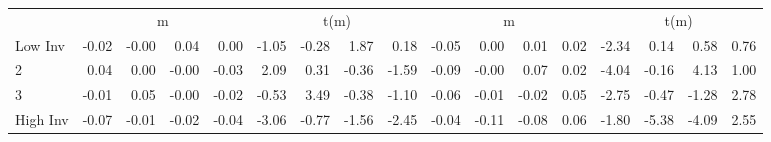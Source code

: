 \begin{table}[!ht]
\begin{tabular}{lrrrrrrrrrrrrrrrr}
  
    
      & \multicolumn{4}{c}{m} & \multicolumn{4}{c}{t(m)}
    
      & \multicolumn{4}{c}{m} & \multicolumn{4}{c}{t(m)}
    
    \\
      \cmidrule(r){2-5} \cmidrule(r){6-9} \cmidrule(r){10-13} \cmidrule(r){14-17}

    Low Inv   & -0.02  & -0.00  & 0.04  & 0.00  & -1.05  & -0.28  & 1.87  & 0.18  & -0.05  & 0.00  & 0.01  & 0.02  & -2.34  & 0.14  & 0.58  & 0.76  \\
           2  & 0.04  & 0.00  & -0.00  & -0.03  & 2.09  & 0.31  & -0.36  & -1.59  & -0.09  & -0.00  & 0.07  & 0.02  & -4.04  & -0.16  & 4.13  & 1.00  \\
           3  & -0.01  & 0.05  & -0.00  & -0.02  & -0.53  & 3.49  & -0.38  & -1.10  & -0.06  & -0.01  & -0.02  & 0.05  & -2.75  & -0.47  & -1.28  & 2.78  \\
    High Inv  & -0.07  & -0.01  & -0.02  & -0.04  & -3.06  & -0.77  & -1.56  & -2.45  & -0.04  & -0.11  & -0.08  & 0.06  & -1.80  & -5.38  & -4.09  & 2.55  \\

  

  \bottomrule
\end{tabular}
\label{tbl:32_Size_OP_Inv_C1997}
\end{table}